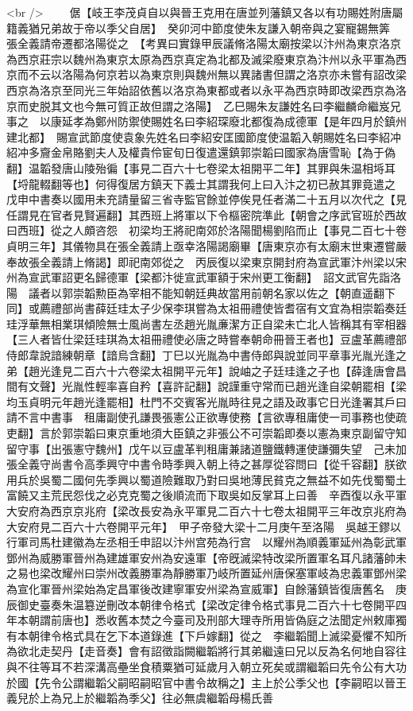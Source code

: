 <br />
　　倨【岐王李茂貞自以與晉王克用在唐並列藩鎮又各以有功賜姓附唐屬籍義猶兄弟故于帝以季父自居】　癸卯河中節度使朱友謙入朝帝與之宴寵錫無筭　張全義請帝遷都洛陽從之　【考異曰實錄甲辰議脩洛陽太廟按梁以汴州為東京洛京為西京莊宗以魏州為東京太原為西京真定為北都及滅梁廢東京為汴州以永平軍為西京而不云以洛陽為何京若以為東京則與魏州無以異諸書但謂之洛京亦未嘗有詔改梁西京為洛京至同光三年始詔依舊以洛京為東都或者以永平為西京時即改梁西京為洛京而史脱其文也今無可質正故但謂之洛陽】　乙巳賜朱友謙姓名曰李繼麟命繼岌兄事之　以康延孝為鄭州防禦使賜姓名曰李紹琛廢北都復為成德軍【是年四月於鎮州建北都】　賜宣武節度使袁象先姓名曰李紹安匡國節度使温韜入朝賜姓名曰李紹冲紹冲多齎金帛賂劉夫人及權貴伶宦旬日復遣還鎮郭崇韜曰國家為唐雪恥【為于偽翻】温韜發唐山陵殆徧【事見二百六十七卷梁太祖開平二年】其罪與朱温相埓耳【埒龍輟翻等也】何得復居方鎮天下義士其謂我何上曰入汴之初已赦其罪竟遣之　戊申中書奏以國用未充請量留三省寺監官餘並停俟見任者滿二十五月以次代之【見任謂見在官者見賢遍翻】其西班上將軍以下令樞密院準此【朝會之序武官班於西故曰西班】從之人頗咨怨　初梁均王將祀南郊於洛陽聞楊劉陷而止【事見二百七十卷貞明三年】其儀物具在張全義請上亟幸洛陽謁廟畢【唐東京亦有太廟末世東遷嘗嚴奉故張全義請上脩謁】即祀南郊從之　丙辰復以梁東京開封府為宣武軍汴州梁以宋州為宣武軍詔更名歸德軍【梁都汴徙宣武軍額于宋州更工衡翻】　詔文武官先詣洛陽　議者以郭崇韜勲臣為宰相不能知朝廷典故當用前朝名家以佐之【朝直遥翻下同】或薦禮部尚書薛廷珪太子少保李琪嘗為太祖冊禮使皆耆宿有文宜為相崇韜奏廷珪浮華無相業琪傾險無士風尚書左丞趙光胤亷潔方正自梁未亡北人皆稱其有宰相器【三人者皆仕梁廷珪琪為太祖冊禮使必唐之時嘗奉朝命冊晉王者也】豆盧革薦禮部侍郎韋說諳練朝章【諳烏含翻】丁巳以光胤為中書侍郎與說並同平章事光胤光逢之弟【趙光逢見二百六十六卷梁太祖開平元年】說岫之子廷珪逢之子也【薛逢唐會昌間有文聲】光胤性輕率喜自矜【喜許記翻】說謹重守常而已趙光逢自梁朝罷相【梁均玉貞明元年趙光逢罷相】杜門不交賓客光胤時往見之語及政事它日光逢署其戶曰請不言中書事　租庸副使孔謙畏張憲公正欲專使務【言欲專租庸使一司事務也使疏吏翻】言於郭崇韜曰東京重地須大臣鎮之非張公不可崇韜即奏以憲為東京副留守知留守事【出張憲守魏州】戊午以豆盧革判租庸兼諸道鹽鐵轉運使謙彌失望　己未加張全義守尚書令高季興守中書令時季興入朝上待之甚厚從容問曰【從千容翻】朕欲用兵於吳蜀二國何先季興以蜀道險難取乃對曰吳地薄民貧克之無益不如先伐蜀蜀土富饒又主荒民怨伐之必克克蜀之後順流而下取吳如反掌耳上曰善　辛酉復以永平軍大安府為西京京兆府【梁改長安為永平軍見二百六十七卷太祖開平三年改京兆府為大安府見二百六十六卷開平元年】　甲子帝發大梁十二月庚午至洛陽　吳越王鏐以行軍司馬杜建徽為左丞相壬申詔以汴州宫苑為行宫　以耀州為順義軍延州為彰武軍鄧州為威勝軍晉州為建雄軍安州為安遠軍【帝旣滅梁特改梁所置軍名耳凡諸藩帥未之易也梁改耀州曰崇州改義勝軍為靜勝軍乃岐所置延州唐保塞軍岐為忠義軍鄧州梁為宣化軍晉州梁始為定昌軍後改建寧軍安州梁為宣威軍】自餘藩鎮皆復唐舊名　庚辰御史臺奏朱温簒逆刪改本朝律令格式【梁改定律令格式事見二百六十七卷開平四年本朝謂前唐也】悉收舊本焚之今臺司及刑部大理寺所用皆偽庭之法聞定州敕庫獨有本朝律令格式具在乞下本道錄進【下戶嫁翻】從之　李繼韜聞上滅梁憂懼不知所為欲北走契丹【走音奏】會有詔徵詣闕繼韜將行其弟繼遠曰兄以反為名何地自容往與不往等耳不若深溝高壘坐食積粟猶可延歲月入朝立死矣或謂繼韜曰先令公有大功於國【先令公謂繼韜父嗣昭嗣昭官中書令故稱之】主上於公季父也【李嗣昭以晉王義兒於上為兄上於繼韜為季父】往必無虞繼韜母楊氏善